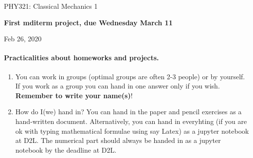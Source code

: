 \documentclass[%
oneside,                 %
final,                   %
10pt]{article}
\begin{document}

\newcommand{\exercisesection}[1]{\subsection*{#1}}






\thispagestyle{empty}

\begin{center}
{\LARGE\bf
\begin{spacing}{1.25}
PHY321: Classical Mechanics 1
\end{spacing}
}
\end{center}


\begin{center}
{\bf First mditerm project, due Wednesday March 11${}^{}$} \\ [0mm]
\end{center}

\begin{center}
\end{center}
    

\begin{center}
Feb 26, 2020
\end{center}

\vspace{1cm}


\paragraph{Practicalities about  homeworks and projects.}
\begin{enumerate}
\item You can work in groups (optimal groups are often 2-3 people) or by yourself. If you work as a group you can hand in one answer only if you wish. \textbf{Remember to write your name(s)}!

\item How do I(we)  hand in?  You can hand in the paper and pencil exercises as a hand-written document. Alternatively, you can hand in everyhting (if you are ok with typing mathematical formulae using say Latex) as a jupyter notebook at D2L. The numerical part should always be handed in as a jupyter notebook by the deadline at D2L. 
\end{enumerate}
\end{document}
